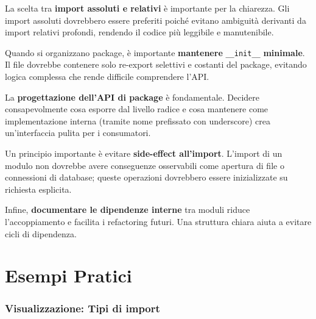 \begin{tcolorbox}[title=Strutturazione e convenzioni]
La scelta tra \textbf{import assoluti e relativi} è importante per la chiarezza. Gli import assoluti dovrebbero essere preferiti poiché evitano ambiguità derivanti da import relativi profondi, rendendo il codice più leggibile e manutenibile.

Quando si organizzano package, è importante \textbf{mantenere } \texttt{\_\_init\_\_} \textbf{ minimale}. Il file dovrebbe contenere solo re-export selettivi e costanti del package, evitando logica complessa che rende difficile comprendere l'API.

La \textbf{progettazione dell'API di package} è fondamentale. Decidere consapevolmente cosa esporre dal livello radice e cosa mantenere come implementazione interna (tramite nome prefissato con underscore) crea un'interfaccia pulita per i consumatori.

Un principio importante è evitare \textbf{side-effect all'import}. L'import di un modulo non dovrebbe avere conseguenze osservabili come apertura di file o connessioni di database; queste operazioni dovrebbero essere inizializzate su richiesta esplicita.

Infine, \textbf{documentare le dipendenze interne} tra moduli riduce l'accoppiamento e facilita i refactoring futuri. Una struttura chiara aiuta a evitare cicli di dipendenza.
\end{tcolorbox}

\section{Esempi Pratici}

\subsubsection{Visualizzazione: Tipi di import}
\begin{center}
\end{center}

